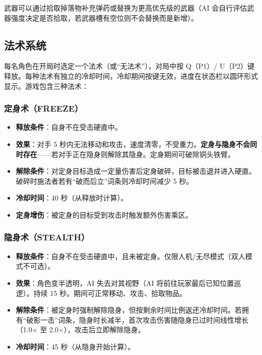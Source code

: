 \documentclass[utf8]{ctexart}
\begin{document}
武器可以通过拾取掉落物补充弹药或替换为更高优先级的武器（AI 会自行评估武器强度决定是否拾取，若武器槽有空位则不会替换而是新增）。

\subsection{法术系统}

每名角色在开局时选定一个法术（或“无法术”），对局中按 Q（P1）/ U（P2）键释放。每种法术有独立的冷却时间，冷却期间按键无效，进度在状态栏以圆环形式显示。游戏包含三种法术：

\subsubsection{定身术（FREEZE）}

\begin{itemize}
  \item \textbf{释放条件}：自身不在受击硬直中。
  \item \textbf{效果}：对手 5 秒内无法移动和攻击，速度清零，不受重力。\textbf{定身与隐身不会同时存在}——若对手正在隐身则解除其隐身。定身期间可破除铜头铁臂。
  \item \textbf{解除条件}：对定身目标造成一定量伤害后定身破碎，目标被击退并进入硬直。破碎时施法者若有“破而后立”词条则冷却时间减少 5 秒。
  \item \textbf{冷却时间}：40 秒（从释放时计算）。
  \item \textbf{定身增伤}：被定身的目标受到攻击时触发额外伤害乘区。
\end{itemize}

\subsubsection{隐身术（STEALTH）}

\begin{itemize}
  \item \textbf{释放条件}：自身不在受击硬直中，且未被定身。仅限人机/无尽模式（双人模式不可选）。
  \item \textbf{效果}：角色变半透明，AI 失去对其视野（AI 将前往玩家最后已知位置巡逻）。持续 15 秒。期间可正常移动、攻击、拾取物品。
  \item \textbf{解除条件}：被定身时强制解除隐身，但按剩余时间比例返还冷却时间。若拥有“破影一击”词条，隐身时长减半，首次攻击伤害随隐身已过时间线性增长（1.0$\times$ 至 2.0$\times$），攻击后立即解除隐身。
  \item \textbf{冷却时间}：45 秒（从隐身开始计算）。
\end{itemize}
\end{document}
